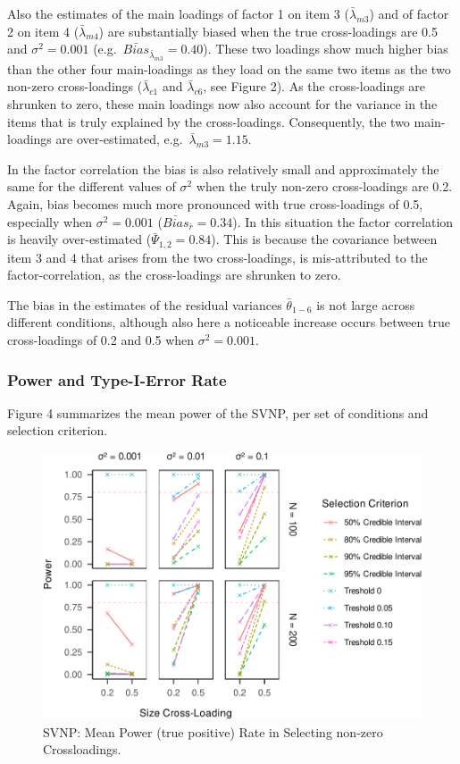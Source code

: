 \documentclass[
  man, donotrepeattitle,floatsintext]{apa6}
\begin{document}
Also the estimates of the main loadings of factor 1 on item 3 (\(\bar{\lambda}_{m 3}\)) and of factor 2 on item 4 (\(\bar{\lambda}_{m 4}\)) are substantially biased when the true cross-loadings are 0.5 and \(\sigma^2 = 0.001\) (e.g.~\(\bar{Bias}_{\bar{\lambda}_{m 3}} = 0.40\)). These two loadings show much higher bias than the other four main-loadings as they load on the same two items as the two non-zero cross-loadings (\(\bar{\lambda}_{c 1}\) and \(\bar{\lambda}_{c 6}\), see Figure 2). As the cross-loadings are shrunken to zero, these main loadings now also account for the variance in the items that is truly explained by the cross-loadings. Consequently, the two main-loadings are over-estimated, e.g.~\(\bar{\lambda}_{m 3} = 1.15\).

In the factor correlation the bias is also relatively small and approximately the same for the different values of \(\sigma^2\) when the truly non-zero cross-loadings are 0.2. Again, bias becomes much more pronounced with true cross-loadings of 0.5, especially when \(\sigma^2 = 0.001\) (\(\bar{Bias}_{\bar{r}} = 0.34\)). In this situation the factor correlation is heavily over-estimated (\(\bar{\Psi}_{1,2} = 0.84\)). This is because the covariance between item 3 and 4 that arises from the two cross-loadings, is mis-attributed to the factor-correlation, as the cross-loadings are shrunken to zero.

The bias in the estimates of the residual variances \(\bar{\theta}_{1-6}\) is not large across different conditions, although also here a noticeable increase occurs between true cross-loadings of 0.2 and 0.5 when \(\sigma^2 = 0.001\).

\hypertarget{power-and-type-i-error-rate-1}{%
\subsubsection{Power and Type-I-Error Rate}\label{power-and-type-i-error-rate-1}}

Figure 4 summarizes the mean power of the SVNP, per set of conditions and selection criterion.

\begin{figure}
\centering
\includegraphics{JMBKoch_thesis_files/figure-latex/unnamed-chunk-4-1.pdf}
\caption{\label{fig:unnamed-chunk-4}SVNP: Mean Power (true positive) Rate in Selecting non-zero Crossloadings.}
\end{figure}
\end{document}
